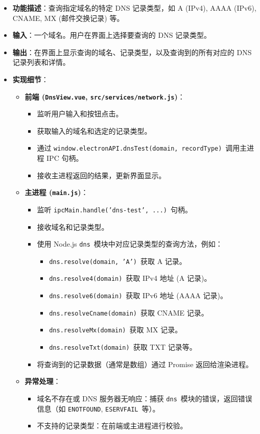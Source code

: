 \documentclass{article}
\begin{document}
\begin{itemize}
    \item \textbf{功能描述}：查询指定域名的特定 DNS 记录类型，如 A (IPv4), AAAA (IPv6), CNAME, MX (邮件交换记录) 等。
    \item \textbf{输入}：一个域名。用户在界面上选择要查询的 DNS 记录类型。
    \item \textbf{输出}：在界面上显示查询的域名、记录类型，以及查询到的所有对应的 DNS 记录列表和详情。
    \item \textbf{实现细节}：
    \begin{itemize}
        \item \textbf{前端 (\texttt{DnsView.vue}, \texttt{src/services/network.js})}：
        \begin{itemize}
            \item 监听用户输入和按钮点击。
            \item 获取输入的域名和选定的记录类型。
            \item 通过 \texttt{window.electronAPI.dnsTest(domain, recordType)}\ 调用主进程 IPC 句柄。
            \item 接收主进程返回的结果，更新界面显示。
        \end{itemize}
        \item \textbf{主进程 (\texttt{main.js})}：
        \begin{itemize}
            \item 监听 \texttt{ipcMain.handle('dns-test', ...)}\ 句柄。
            \item 接收域名和记录类型。
            \item 使用 Node.js \texttt{dns}\ 模块中对应记录类型的查询方法，例如：
            \begin{itemize}
                \item \texttt{dns.resolve(domain, 'A')}\ 获取 A 记录。
                \item \texttt{dns.resolve4(domain)}\ 获取 IPv4 地址 (A 记录)。
                \item \texttt{dns.resolve6(domain)}\ 获取 IPv6 地址 (AAAA 记录)。
                \item \texttt{dns.resolveCname(domain)}\ 获取 CNAME 记录。
                \item \texttt{dns.resolveMx(domain)}\ 获取 MX 记录。
                \item \texttt{dns.resolveTxt(domain)}\ 获取 TXT 记录等。
            \end{itemize}
            \item 将查询到的记录数据（通常是数组）通过 Promise 返回给渲染进程。
        \end{itemize}
        \item \textbf{异常处理}：
        \begin{itemize}
            \item 域名不存在或 DNS 服务器无响应：捕获 \texttt{dns}\ 模块的错误，返回错误信息（如 \texttt{ENOTFOUND}, \texttt{ESERVFAIL}\ 等）。
            \item 不支持的记录类型：在前端或主进程进行校验。
        \end{itemize}
    \end{itemize}
\end{itemize}
\end{document}
